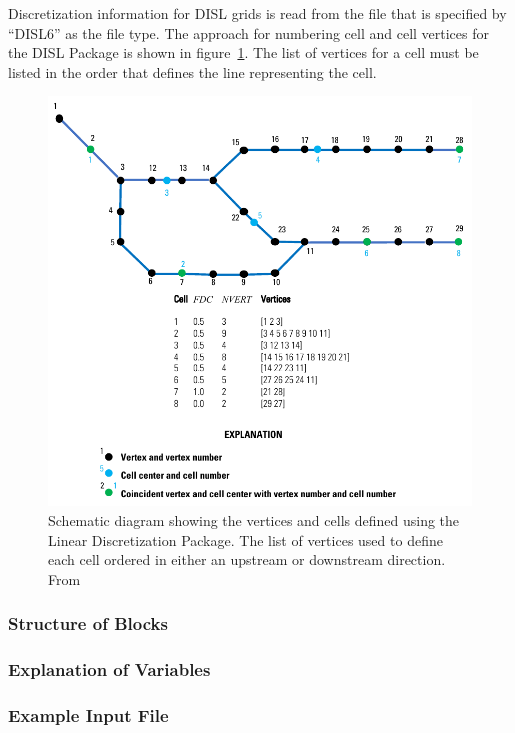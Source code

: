 Discretization information for DISL grids is read from the file that is specified by ``DISL6'' as the file type. The approach for numbering cell and cell vertices for the DISL Package is shown in figure~\ref{fig:disl_example}.  The list of vertices for a cell must be listed in the order that defines the line representing the cell. 

\begin{figure}[ht]
	\centering
	\includegraphics[scale=1.0]{Figures/DISL_example}
	\caption{Schematic diagram showing the vertices and cells defined using the Linear Discretization Package. The list of vertices used to define each cell ordered in either an upstream or downstream direction.  From \cite{modflow6gwf}}
	\label{fig:disl_example}
\end{figure}


\vspace{5mm}
\subsubsection{Structure of Blocks}






\vspace{5mm}
\subsubsection{Explanation of Variables}
\begin{description}

\end{description}

\vspace{5mm}
\subsubsection{Example Input File}


